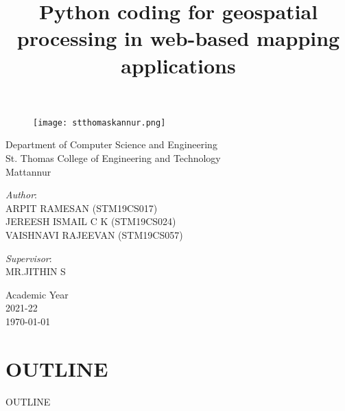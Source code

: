 \documentclass[svgnames,9pt]{beamer}
\title[Handwritten Digit Recognition Using Improved Bounding Box Recognition Technique]{\huge \textbf{Python coding for geospatial processing in web-based mapping applications}  } %
\author[Group-14]{}
\date{}
\begin{document}
	\begin{frame}
		
		\begin{figure}[h!]
			\texttt{[image: stthomaskannur.png]}
		\end{figure}
		
		\begin{center}      
			\begin{minipage}[b]{1.0\textwidth}
				\centering
				Department of Computer Science and Engineering\\
				St. Thomas College of Engineering and Technology\\Mattannur
			\end{minipage}%
		\end{center}
		
		\titlepage
		
		\begin{minipage}[t]{0.5\textwidth}
			\vspace{-2cm}
			\begin{flushleft}
				{ \textit{Author}:\vspace*{0.1cm} \\ ARPIT RAMESAN (STM19CS017)\\ JEREESH ISMAIL C K (STM19CS024)\\ VAISHNAVI RAJEEVAN (STM19CS057) } %
			\end{flushleft}
		\end{minipage}%
		\begin{minipage}[t]{0.5\textwidth}
			\vspace{-2cm}
			\begin{flushright}
				{\textit{Supervisor}:\vspace*{0.1cm} \\ MR.JITHIN S} %
			\end{flushright}    
		\end{minipage}%
		
		\vspace{-0.7cm}
		\begin{center}      
			\begin{minipage}[b]{0.5\textwidth}
				\centering  
				\small Academic Year \\ 2021-22\\ \today
			\end{minipage}%
		\end{center}    
	\end{frame}
\section{OUTLINE}
\begin{frame}{OUTLINE}
        \tableofcontents
\end{frame}
\end{document}
